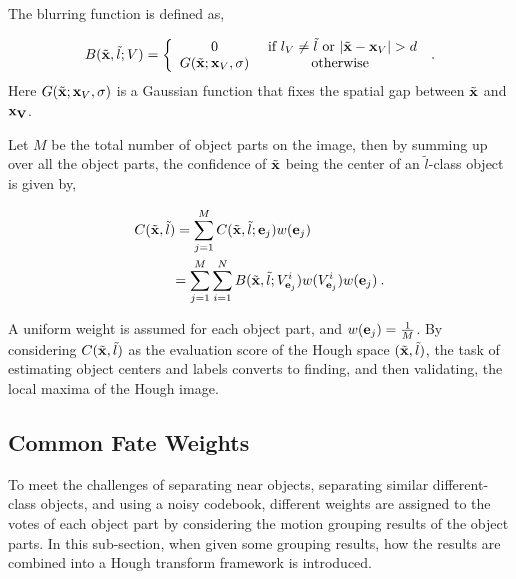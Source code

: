 \documentclass{mva2011}
\begin{document}
The blurring function is defined as,

\begin{equation}
B(\tilde{\bf{x}},\tilde l;V)
= \left\{ \begin{array}{*{20}{c}}
   0   &\mbox{  if } {l_V} \ne \tilde{l} \mbox{ or } |\tilde{\bf{x}} - {\bf{x}}_V| > d   \\
   G(\tilde{\bf{x}};{{\bf{x}}_V},\sigma) &\mbox{otherwise}
\end{array} \right. \:.
\label{eq2}
\end{equation}
Here $G(\tilde{\bf{x}};{\bf{x}}_V,\sigma )$ is a Gaussian function that fixes the spatial gap between $\tilde{\bf{x}}$ and ${\bf{x}_V}$.

Let $M$ be the total number of object parts on the image, then by summing up over all the object parts, the confidence of $\tilde{\bf{x}}$ being the center of an $\tilde{l}$-class object is given by,

\begin{equation}
\begin{aligned}
C({\tilde{\bf{x}}},\tilde{l}) &=\sum\limits^M_{j=1} C({\tilde{\bf{x}}},\tilde{l};{\bf{e}}_j)w({\bf{e}}_j) \\
&{
\begin{aligned}
=\sum\limits^M_{j=1} \sum\limits^N_{i=1} {B({\tilde{\bf{x}}},{\tilde{l}};{V_{{\bf{e}}_j}^i}) w({V_{{\bf{e}}_j}^i})w({\bf{e}}_j)} \:.
\end{aligned}
}
\end{aligned}
\label{eq3}
\end{equation}

A uniform weight is assumed for each object part, and $w({\bf{e}}_j)=\frac 1 M$. By considering $C({\tilde{\bf{x}}},\tilde{l})$ as the evaluation score of the Hough space $({\tilde{\bf{x}}},\tilde{l})$, the task of estimating object centers and labels converts to finding, and then validating, the local maxima of the Hough image.

\subsection{Common Fate Weights}

To meet the challenges of separating near objects, separating similar different-class objects, and using a noisy codebook,  different weights are assigned to the votes of each object part by considering the motion grouping results of the object parts. In this sub-section, when given some grouping results, how the results are combined into a Hough transform framework is introduced.
\end{document}
